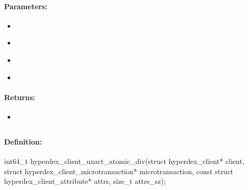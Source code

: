 \paragraph{Parameters:}
\begin{itemize}[noitemsep]
\item {}\\

\item {}\\

\item {}\\

\item {}\\

\end{itemize}

\paragraph{Returns:}
\begin{itemize}[noitemsep]
\item {}\\

\end{itemize}

\pagebreak
\subsection{}
\label{api:c:uxact_atomic_div}


\paragraph{Definition:}
\begin{ccode}
int64_t hyperdex_client_uxact_atomic_div(struct hyperdex_client* client,
        struct hyperdex_client_microtransaction* microtransaction,
        const struct hyperdex_client_attribute* attrs, size_t attrs_sz);
\end{ccode}

